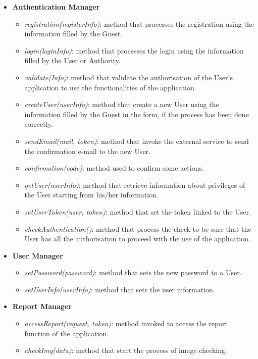 \documentclass{article}
\begin{document}
	\begin{itemize}
    	\item {\bf Authentication Manager}
       		\begin{itemize}
        		\item {\it registration(registerInfo)}: method that processes the registration using the information filled by the Guest.
        		\item {\it login(loginInfo)}: method that processes the login using the information filled by the User or Authority.
        		\item {\it validate(Info)}: method that validate the authorisation of the User's application to use the functionalities of the application.
        		\item {\it createUser(userInfo)}: method that create a new User using the information filled by the Guest in the form, if the process has been done correctly.
        		\item {\it sendEmail(mail, token)}: method that invoke the external service to send the confirmation e-mail to the new User.
        		\item {\it confirmation(code)}: method used to confirm some actions.
        		\item {\it getUser(userInfo)}: method that retrieve information about privileges of the User starting from his/her information.
        		\item {\it setUserToken(user, token)}: method that set the token linked to the User.
        		\item {\it checkAuthentication()}: method that process the check to be sure that the User has all the authorisation to proceed with the use of the application. 
    		\end{itemize}
    	\item {\bf User Manager}
    		\begin{itemize}
        		\item {\it setPassword(password)}: method that sets the new password to a User.
        		\item {\it setUserInfo(userInfo)}: method that sets the user information.
    		\end{itemize}
    	\item {\bf Report Manager}
    		\begin{itemize}
        		\item {\it accessReport(request, token)}: method invoked to access the report function of the application.
        		\item {\it checkImg(data)}: method that start the process of image checking.

\end{itemize}
\end{itemize}
\end{document}
